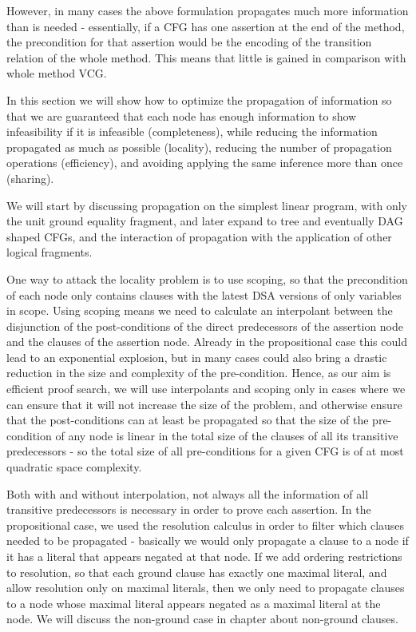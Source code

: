 However, in many cases the above formulation propagates much more information than is needed - essentially, if a CFG has one assertion at the end of the method, the precondition for that assertion would be the encoding of the transition relation of the whole method.
This means that little is gained in comparison with whole method VCG.

In this section we will show how to optimize the propagation of information so that we are guaranteed that each node has enough information to show infeasibility if it is infeasible (completeness), 
while reducing the information propagated as much as possible (locality),
reducing the number of propagation operations (efficiency),
and avoiding applying the same inference more than once (sharing).

We will start by discussing propagation on the simplest linear program, with only the unit ground equality fragment, 
and later expand to tree and eventually DAG shaped CFGs, 
and the interaction of propagation with the application of other logical fragments.

One way to attack the locality problem is to use scoping, so that the precondition of each node only contains clauses with the latest DSA versions of only variables in scope. Using scoping means we need to calculate an interpolant between the disjunction of the post-conditions of the direct predecessors of the assertion node and the clauses of the assertion node. Already in the propositional case this could lead to an exponential explosion, but in many cases could also bring a drastic reduction in the size and complexity of the pre-condition. 
Hence, as our aim is efficient proof search, we will use interpolants and scoping only in cases where we can ensure that it will not increase the size of the problem, and otherwise ensure that the post-conditions can at least be propagated so that the size of the pre-condition of any node is linear in the total size of the clauses of all its transitive predecessors - so the total size of all pre-conditions for a given CFG is of at most quadratic space complexity.

Both with and without interpolation, not always all the information of all transitive predecessors is necessary in order to prove each assertion.
In the propositional case, we used the resolution calculus in order to filter which clauses needed to be propagated - basically we would only propagate a clause to a node if it has a literal that appears negated at that node.
If we add ordering restrictions to resolution, so that each ground clause has exactly one maximal literal, and allow resolution only on maximal literals, then we only need to propagate clauses to a node whose maximal literal appears negated as a maximal literal at the node.
We will discuss the non-ground case in chapter about non-ground clauses.

